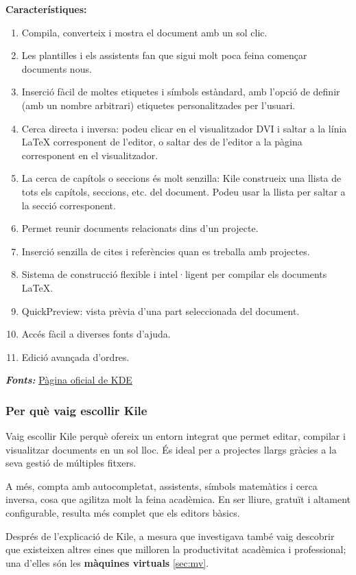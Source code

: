 \textbf{Característiques:}
\begin{enumerate}
 \item Compila, converteix i mostra el document amb un sol clic.
 \item Les plantilles i els assistents fan que sigui molt poca feina començar documents nous.
 \item Inserció fàcil de moltes etiquetes i símbols estàndard, amb l’opció de definir (amb un nombre arbitrari) etiquetes personalitzades per l’usuari.
 \item Cerca directa i inversa: podeu clicar en el visualitzador DVI i saltar a la línia LaTeX corresponent de l’editor, o saltar des de l’editor a la pàgina corresponent en el visualitzador.
 \item La cerca de capítols o seccions és molt senzilla: Kile construeix una llista de tots els capítols, seccions, etc. del document. Podeu usar la llista per saltar a la secció corresponent.
 \item Permet reunir documents relacionats dins d’un projecte.
 \item Inserció senzilla de cites i referències quan es treballa amb projectes.
 \item Sistema de construcció flexible i intel·ligent per compilar els documents LaTeX.
 \item QuickPreview: vista prèvia d’una part seleccionada del document.
 \item Accés fàcil a diverses fonts d’ajuda.
 \item Edició avançada d’ordres.
\end{enumerate}
\textit{\textbf{Fonts:}} \href{https://apps.kde.org/ca/kile}{Pàgina oficial de KDE}\\
\subsubsection{Per què vaig escollir Kile}
Vaig escollir Kile perquè ofereix un entorn integrat que permet editar, compilar i visualitzar documents en un sol lloc. És ideal per a projectes llargs gràcies a la seva gestió de múltiples fitxers.

A més, compta amb autocompletat, assistents, símbols matemàtics i cerca inversa, cosa que agilitza molt la feina acadèmica. En ser lliure, gratuït i altament configurable, resulta més complet que els editors bàsics.

Després de l’explicació de Kile, a mesura que investigava també vaig descobrir que existeixen altres eines que milloren la productivitat acadèmica i professional; una d’elles són les \textbf{màquines virtuals} \ref{sec:mv}.


